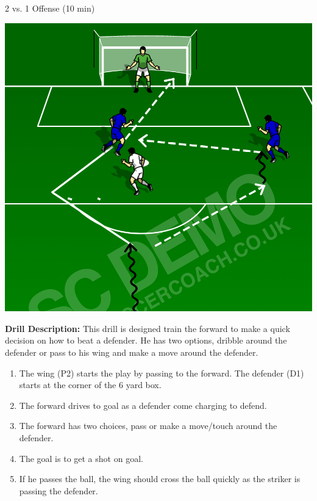 \begin{evenBlock}{2 vs. 1 Offense (10 min)}
\begin{minipage}[t]{\linewidth}
\begin{minipage}{.3\linewidth}
            \includegraphics[width=\textwidth]{../img/Trimmed/2v1_Option_Pass}
    \end{minipage}
    \hspace{0.05\linewidth}
    \begin{minipage}{.6\linewidth} %
        \textbf{Drill Description:}
        This drill is designed train the forward to make a quick decision on how to beat a defender.  He has two options, dribble around the defender or pass to his wing and make a move around the defender. 
        \begin{enumerate}
        \setlength{\itemsep}{0pt}
        \setlength{\parskip}{0pt}
        \setlength{\parsep}{0pt}
        \item The wing (P2) starts the play by passing to the forward.  The defender (D1) starts at the corner of the 6 yard box.
        \item The forward drives to goal as a defender come charging to defend.
        \item The forward has two choices, pass or make a move/touch around the defender.
        \item The goal is to get a shot on goal.
        \item If he passes the ball, the wing should cross the ball quickly as the striker is passing the defender.
        \end{enumerate}


\end{minipage}
\end{minipage}
\end{evenBlock}
